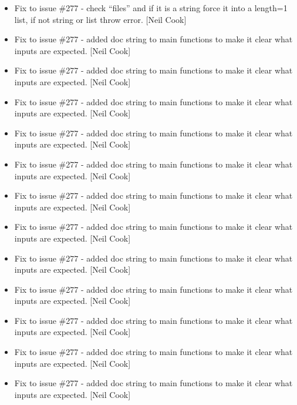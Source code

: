 \documentclass[a4paper,10pt,english]{report}
\begin{document}
\begin{itemize}
\item {} 
Fix to issue \#277 - check “files” and if it is a string force it into
a length=1 list, if not string or list throw error. {[}Neil Cook{]}

\item {} 
Fix to issue \#277 - added doc string to main functions to make it
clear what inputs are expected. {[}Neil Cook{]}

\item {} 
Fix to issue \#277 - added doc string to main functions to make it
clear what inputs are expected. {[}Neil Cook{]}

\item {} 
Fix to issue \#277 - added doc string to main functions to make it
clear what inputs are expected. {[}Neil Cook{]}

\item {} 
Fix to issue \#277 - added doc string to main functions to make it
clear what inputs are expected. {[}Neil Cook{]}

\item {} 
Fix to issue \#277 - added doc string to main functions to make it
clear what inputs are expected. {[}Neil Cook{]}

\item {} 
Fix to issue \#277 - added doc string to main functions to make it
clear what inputs are expected. {[}Neil Cook{]}

\item {} 
Fix to issue \#277 - added doc string to main functions to make it
clear what inputs are expected. {[}Neil Cook{]}

\item {} 
Fix to issue \#277 - added doc string to main functions to make it
clear what inputs are expected. {[}Neil Cook{]}

\item {} 
Fix to issue \#277 - added doc string to main functions to make it
clear what inputs are expected. {[}Neil Cook{]}

\item {} 
Fix to issue \#277 - added doc string to main functions to make it
clear what inputs are expected. {[}Neil Cook{]}

\item {} 
Fix to issue \#277 - added doc string to main functions to make it
clear what inputs are expected. {[}Neil Cook{]}

\item {} 
Fix to issue \#277 - added doc string to main functions to make it
clear what inputs are expected. {[}Neil Cook{]}

\end{itemize}
\end{document}
